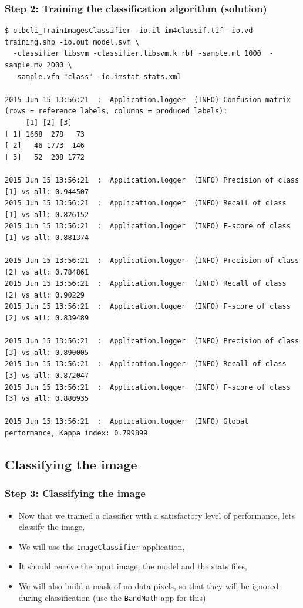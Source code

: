 \documentclass[8pt]{beamer}
\begin{document}
\begin{frame}[fragile]
\frametitle{Step 2: Training the classification algorithm (solution)}

\begin{scriptsize}
\begin{verbatim}
$ otbcli_TrainImagesClassifier -io.il im4classif.tif -io.vd training.shp -io.out model.svm \
  -classifier libsvm -classifier.libsvm.k rbf -sample.mt 1000  -sample.mv 2000 \
  -sample.vfn "class" -io.imstat stats.xml

2015 Jun 15 13:56:21  :  Application.logger  (INFO) Confusion matrix (rows = reference labels, columns = produced labels):
     [1] [2] [3] 
[ 1] 1668  278   73 
[ 2]   46 1773  146 
[ 3]   52  208 1772 

2015 Jun 15 13:56:21  :  Application.logger  (INFO) Precision of class [1] vs all: 0.944507
2015 Jun 15 13:56:21  :  Application.logger  (INFO) Recall of class    [1] vs all: 0.826152
2015 Jun 15 13:56:21  :  Application.logger  (INFO) F-score of class   [1] vs all: 0.881374

2015 Jun 15 13:56:21  :  Application.logger  (INFO) Precision of class [2] vs all: 0.784861
2015 Jun 15 13:56:21  :  Application.logger  (INFO) Recall of class    [2] vs all: 0.90229
2015 Jun 15 13:56:21  :  Application.logger  (INFO) F-score of class   [2] vs all: 0.839489

2015 Jun 15 13:56:21  :  Application.logger  (INFO) Precision of class [3] vs all: 0.890005
2015 Jun 15 13:56:21  :  Application.logger  (INFO) Recall of class    [3] vs all: 0.872047
2015 Jun 15 13:56:21  :  Application.logger  (INFO) F-score of class   [3] vs all: 0.880935

2015 Jun 15 13:56:21  :  Application.logger  (INFO) Global performance, Kappa index: 0.799899

\end{verbatim}
\end{scriptsize}

\end{frame}

\subsection{Classifying the image}

\begin{frame}
\frametitle{Step 3: Classifying the image}

\begin{itemize}
\item Now that we trained a classifier with a satisfactory level of performance, lets classify the image,
\item We will use the \texttt{ImageClassifier} application,
\item It should receive the input image, the model and the stats files,
\item We will also build a mask of no data pixels, so that they will be ignored during classification (use the \texttt{BandMath} app for this)
\end{itemize}

\end{frame}
\end{document}
